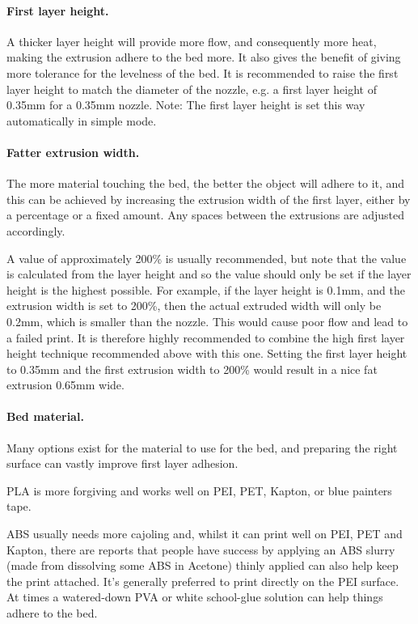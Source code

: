 \paragraph{First layer height.} %
\label{par:first_layer_height}
A thicker layer height will provide more flow, and consequently more heat, making the extrusion adhere to the bed more.  It also gives the benefit of giving more tolerance for the levelness of the bed.  It is recommended to raise the first layer height to match the diameter of the nozzle, e.g. a first layer height of 0.35mm for a 0.35mm nozzle.
Note: The first layer height is set this way automatically in simple mode.

\paragraph{Fatter extrusion width.} %
\label{par:wider_extrusion_width}
The more material touching the bed, the better the object will adhere to it, and this can be achieved by increasing the extrusion width of the first layer, either by a percentage or a fixed amount.  Any spaces between the extrusions are adjusted accordingly.

A value of approximately 200\% is usually recommended, but note that the value is calculated from the layer height and so the value should only be set if the layer height is the highest possible.  For example, if the layer height is 0.1mm, and the extrusion width is set to 200\%, then the actual extruded width will only be 0.2mm, which is smaller than the nozzle.   This would cause poor flow and lead to a failed print.  It is therefore highly recommended to combine the high first layer height technique recommended above with this one. Setting the first layer height to 0.35mm and the first extrusion width to 200\% would result in a nice fat extrusion 0.65mm wide.

\paragraph{Bed material.} %
\label{par:bed_material}
Many options exist for the material to use for the bed, and preparing the right surface can vastly improve first layer adhesion.

PLA is more forgiving and works well on PEI, PET, Kapton, or blue painters tape.

ABS usually needs more cajoling and, whilst it can print well on PEI, PET and Kapton, there are reports that people have success by applying an ABS slurry (made from dissolving some ABS in Acetone) thinly applied can also help keep the print attached. It's generally preferred to print directly on the PEI surface. At times a watered-down PVA or white school-glue solution can help things adhere to the bed.


